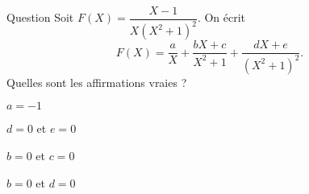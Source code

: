 \begin{multi}[multiple,feedback=
{\(F(X) = \dfrac{1}{X(X^2+1)^2} = \frac{-1}{X} + \frac{X}{X^2+1} +  \frac{X+1}{(X^2+1)^2}.\)
}]{Question}
Soit \(F(X) = \dfrac{X-1}{X(X^2+1)^2}\).
On écrit 
\[F(X) = \frac{a}{X} + \frac{bX+c}{X^2+1} +  \frac{dX+e}{(X^2+1)^2}.\]
Quelles sont les affirmations vraies ?

    \item* \(a=-1\)
    \item \(d=0\) et \(e=0\)
    \item \(b=0\) et \(c=0\)
    \item \(b=0\) et \(d=0\)
\end{multi}
